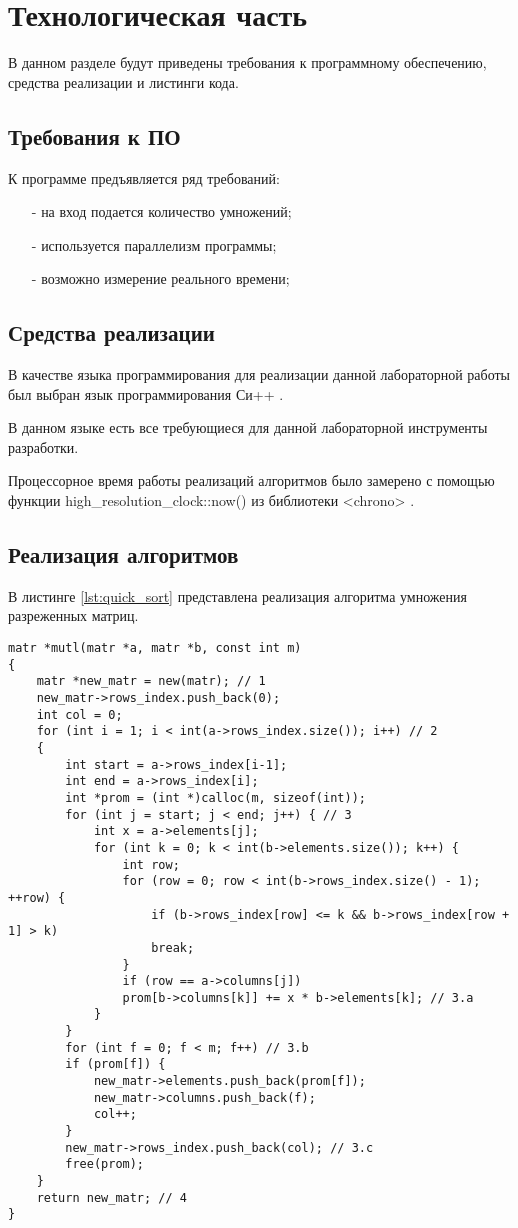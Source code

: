 \chapter{Технологическая часть}

В данном разделе будут приведены требования к программному обеспечению, средства реализации и листинги кода.

\section{Требования к ПО}

К программе предъявляется ряд требований:
\begin{itemize}
	\item[-] на вход подается количество умножений;
	\item[-] используется параллелизм программы;
	\item[-] возможно измерение реального времени;
\end{itemize}

\section{Средства реализации}

В качестве языка программирования для реализации данной лабораторной работы был выбран язык программирования Си++ \cite{pythonlang}. 

В данном языке есть все требующиеся для данной лабораторной инструменты разработки. 

Процессорное время работы реализаций алгоритмов было замерено с помощью функции high\_resolution\_clock::now() из библиотеки <chrono> \cite{pythonlangtime}.

\section{Реализация алгоритмов}
В листинге \ref{lst:quick_sort} представлена реализация алгоритма умножения разреженных матриц.

\begin{lstlisting}[label=lst:quick_sort,caption=Реализация последовательного алгоритма умножения разреженных матриц]
matr *mutl(matr *a, matr *b, const int m)
{
	matr *new_matr = new(matr); // 1
	new_matr->rows_index.push_back(0);
	int col = 0;
	for (int i = 1; i < int(a->rows_index.size()); i++) // 2
	{
		int start = a->rows_index[i-1];
		int end = a->rows_index[i];
		int *prom = (int *)calloc(m, sizeof(int));
		for (int j = start; j < end; j++) { // 3
			int x = a->elements[j];
			for (int k = 0; k < int(b->elements.size()); k++) {
				int row;
				for (row = 0; row < int(b->rows_index.size() - 1); ++row) {
					if (b->rows_index[row] <= k && b->rows_index[row + 1] > k)
					break;
				}
				if (row == a->columns[j])
				prom[b->columns[k]] += x * b->elements[k]; // 3.a
			}
		}
		for (int f = 0; f < m; f++) // 3.b
		if (prom[f]) {
			new_matr->elements.push_back(prom[f]);
			new_matr->columns.push_back(f);
			col++;
		}
		new_matr->rows_index.push_back(col); // 3.c
		free(prom);
	}
	return new_matr; // 4
}
\end{lstlisting}

